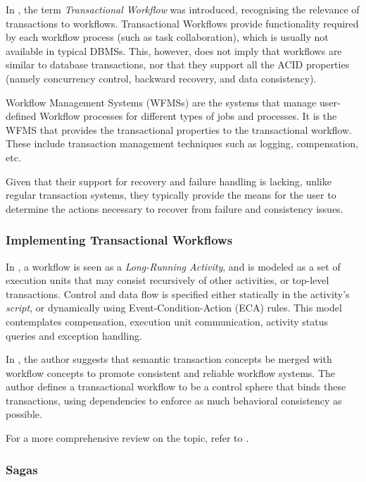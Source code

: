 \documentclass{llncs}
\begin{document}
In \cite{sheth1993transactional}, the term {\it Transactional
  Workflow} was introduced, recognising the relevance of transactions
to workflows. Transactional Workflows provide functionality required
by each workflow process (such as task collaboration), which is
usually not available in typical DBMSs. This, however, does not imply
that workflows are similar to database transactions, nor that they
support all the ACID properties (namely concurrency control, backward
recovery, and data consistency).

Workflow Management Systems (WFMSs) are the systems that manage
user-defined Workflow processes for different types of jobs and
processes. It is the WFMS that provides the transactional properties
to the transactional workflow. These include transaction management
techniques such as logging, compensation, etc.

Given that their support for recovery and failure handling is lacking,
unlike regular transaction systems, they typically provide the means
for the user to determine the actions necessary to recover from
failure and consistency issues.

\subsubsection{Implementing Transactional Workflows}

In \cite{dayal1990organizing}, a workflow is seen as a {\it
  Long-Running Activity}, and is modeled as a set of execution units
that may consist recursively of other activities, or top-level
transactions. Control and data flow is specified either statically in
the activity's {\it script}, or dynamically using
Event-Condition-Action (ECA) rules. This model contemplates
compensation, execution unit communication, activity status queries
and exception handling.

In \cite{weikum1993extending}, the author suggests that semantic
transaction concepts be merged with workflow concepts to promote
consistent and reliable workflow systems. The author defines a
transactional workflow to be a control sphere that binds these
transactions, using dependencies to enforce as much behavioral
consistency as possible.

For a more comprehensive review on the topic, refer to
\cite{worah1997transactions}.

\subsubsection{Sagas}
\end{document}
